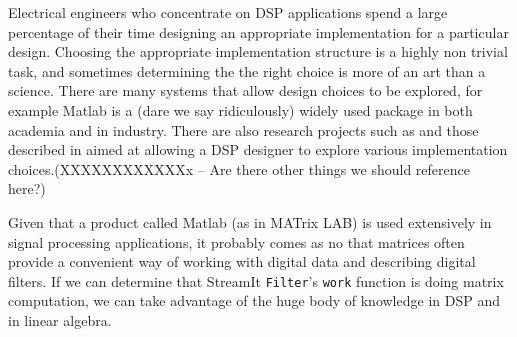 Electrical engineers who concentrate on DSP applications spend a large percentage of their 
time designing an appropriate implementation for a particular design. Choosing
the appropriate implementation structure is a highly non trivial task, and sometimes determining the 
the right choice is more of an art than a science. There are many systems that allow design choices
to be explored, for example Matlab\cite{matlab} is a (dare we say ridiculously) widely used package 
in both academia and in industry. There are also research projects such as \cite{covell-ade} 
and those described in \cite{oppenheim-symbolic} aimed at allowing a DSP designer to explore
various implementation choices.(XXXXXXXXXXXXx -- Are there other things we should reference here?) 

Given that a product called Matlab (as in  MATrix LAB) is used extensively
in signal processing applications, it probably comes as no  that 
matrices often provide a convenient way of working with
digital data and describing digital filters. If we can determine that StreamIt {\tt Filter}'s
{\tt work} function is doing matrix computation, we can take advantage of the huge body
of knowledge in DSP and in linear algebra.
